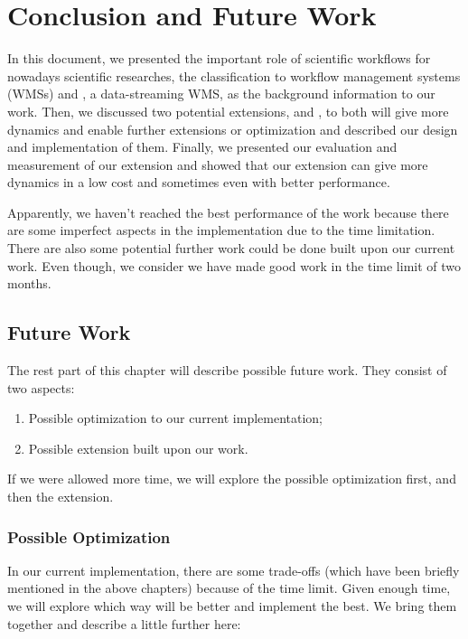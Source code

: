 \chapter{Conclusion and Future Work}
In this document, we presented the important role of scientific workflows for nowadays scientific researches, the classification to workflow management systems (WMSs) and \dpy, a data-streaming WMS, as the background information to our work. Then, we discussed two potential extensions, \tincdep and \tdynexp, to \dpy both will give \dpy more dynamics and enable further extensions or optimization and described our design and implementation of them. Finally, we presented our evaluation and measurement of our extension and showed that our extension can give \dpy more dynamics in a low cost and sometimes even with better performance.

Apparently, we haven't reached the best performance of the work because there are some imperfect aspects in the implementation due to the time limitation. There are also some potential further work could be done built upon our current work. Even though, we consider we have made good work in the time limit of two months.

\section{Future Work}
The rest part of this chapter will describe possible future work. They consist of two aspects:
\begin{enumerate}
	\item Possible optimization to our current implementation;
	\item Possible extension built upon our work.
\end{enumerate}

If we were allowed more time, we will explore the possible optimization first, and then the extension.

\subsection{Possible Optimization}
In our current implementation, there are some trade-offs (which have been briefly mentioned in the above chapters) because of the time limit. Given enough time, we will explore which way will be better and implement the best. We bring them together and describe a little further here:

